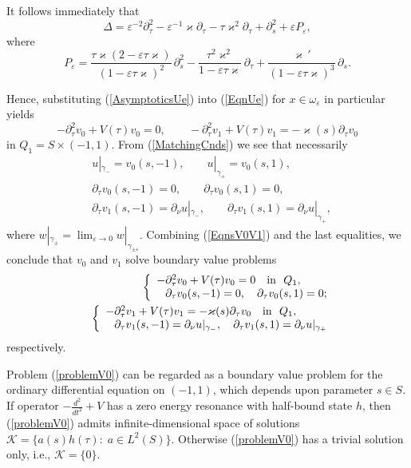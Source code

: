 \documentclass[graybox]{svmult}
\renewcommand{\kappa}{\varkappa}
\newcommand{\eps}{\varepsilon}
\newcommand{\eqref}[1]{(\ref{#1})}
\newcommand{\pte}{\partial_\tau}
\begin{document}
It follows immediately that
$$
\Delta= \eps^{-2}\partial^2_\tau-\eps^{-1}\kappa\partial_\tau-\tau \kappa^2\partial_\tau+\partial^2_s+\eps P_\eps,
$$
where
$$
  P_\eps=\frac{\tau\kappa(2-\eps\tau\kappa)}{(1-\eps \tau\kappa)^2}\,\partial^2_s-\frac{\tau^2\kappa^2}{1-\eps \tau\kappa}\,\partial_\tau+\frac{\kappa\,'}{(1-\eps \tau\kappa)^3}\,\partial_s.
$$

Hence, substituting \eqref{AsymptoticsUe} into \eqref{EqnUe} for $x\in \omega_\eps$ in particular yields
\begin{equation}\label{EqnsV0V1}
-\pte^2 v_0+V(\tau)v_0=0, \qquad -\pte^2 v_1+V(\tau)v_1=-\kappa(s)\pte v_0
\end{equation}
in $Q_1=S\times(-1,1)$.
From \eqref{MatchingCnds} we see that necessarily
\begin{eqnarray}\label{FittingCnds}
  &u|_{\gamma_-}=v_0(s,-1),\qquad u|_{\gamma_+}=v_0(s,1), \\ \nonumber
  &\partial_\tau v_0(s,- 1)=0, \qquad \partial_\tau v_0(s, 1)=0, \\\nonumber
&\partial_\tau v_1(s, -1)=\partial_\nu u|_{\gamma_-}, \qquad
\partial_\tau v_1(s, 1)=\partial_\nu u|_{\gamma_+},
\end{eqnarray}
where $w|_{\gamma_\pm}=\lim_{\eps\to 0}w|_{\gamma_{\pm\eps}}$.
Combining \eqref{EqnsV0V1} and the last equalities, we conclude that $v_0$ and $v_1$ solve boundary value problems
\begin{eqnarray}\label{problemV0}
&&\left\{
  \begin{array}{ll}
    -\pte^2 v_0+V(\tau)v_0=0 \quad \hbox{in \ } Q_1, \\
    \phantom{-}\partial_\tau v_0(s,- 1)=0, \quad \partial_\tau v_0(s, 1)=0;
  \end{array}
\right.\\\label{problemV1}
&&\left\{
  \begin{array}{ll}
    -\pte^2 v_1+V(\tau)v_1=-\kappa(s)\pte v_0\quad \hbox{in \ } Q_1, \\
    \phantom{-}\partial_\tau v_1(s, -1)=\partial_\nu u|_{\gamma_-}, \quad
\partial_\tau v_1(s, 1)=\partial_\nu u|_{\gamma_+}
  \end{array}
\right.
\end{eqnarray}
respectively.

Problem \eqref{problemV0} can be regarded as a boundary value problem for the ordinary differential equation on $(-1,1)$, which depends upon parameter $s\in S$. If operator $-\frac{d^2}{dt^2}+V$ has a zero energy resonance with half-bound state $h$, then \eqref{problemV0}  admits infinite-dimensional space of solutions $\mathcal{K}=\{a(s)h(\tau)\colon \;a\in L^2(S)\}$. Otherwise  \eqref{problemV0} has a trivial solution only, i.e., $\mathcal{K}=\{0\}$.
\end{document}
